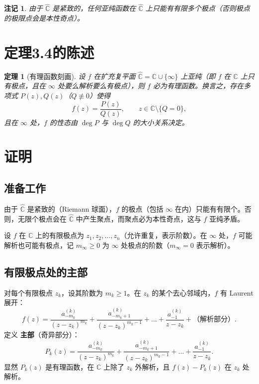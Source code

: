 \documentclass[UTF8]{ctexart}
\newtheorem{theorem}{定理}[section]
\newtheorem{remark}{注记}[section]
\numberwithin{equation}{section}
\newcommand{\CC}{\mathbb{C}}
\begin{document}
\begin{remark}
由于 $\widehat{\CC}$ 是紧致的，任何亚纯函数在 $\widehat{\CC}$ 上只能有有限多个极点（否则极点的极限点会是本性奇点）。
\end{remark}


\section{定理3.4的陈述}

\begin{theorem}[有理函数刻画]
设 $f$ 在扩充复平面 $\widehat{\CC} = \CC \cup \{\infty\}$ 上亚纯（即 $f$ 在 $\CC$ 上只有极点，且在 $\infty$ 处要么解析要么有极点），则 $f$ 必为有理函数。换言之，存在多项式 $P(z), Q(z)$（$Q\not\equiv 0$）使得
\[
f(z) = \frac{P(z)}{Q(z)},\qquad z\in\CC\setminus\{Q=0\},
\]
且在 $\infty$ 处，$f$ 的性态由 $\deg P$ 与 $\deg Q$ 的大小关系决定。
\end{theorem}

\section{证明}

\subsection{准备工作}

由于 $\widehat{\CC}$ 是紧致的（Riemann 球面），$f$ 的极点（包括 $\infty$ 在内）只能有有限个。否则，无限个极点会在 $\widehat{\CC}$ 中产生聚点，而聚点必为本性奇点，这与 $f$ 亚纯矛盾。

设 $f$ 在 $\CC$ 上的有限极点为 $z_1, z_2, \dots, z_n$（允许重复，表示阶数）。在 $\infty$ 处，$f$ 可能解析也可能有极点，记 $m_\infty \ge 0$ 为 $\infty$ 处极点的阶数（$m_\infty = 0$ 表示解析）。

\subsection{有限极点处的主部}

对每个有限极点 $z_k$，设其阶数为 $m_k \ge 1$。在 $z_k$ 的某个去心邻域内，$f$ 有 Laurent 展开：
\[
f(z) = \frac{a_{-m_k}^{(k)}}{(z-z_k)^{m_k}} + \frac{a_{-m_k+1}^{(k)}}{(z-z_k)^{m_k-1}} + \dots + \frac{a_{-1}^{(k)}}{z-z_k} + \text{（解析部分）}.
\]
定义 \textbf{主部}（奇异部分）：
\[
P_k(z) = \frac{a_{-m_k}^{(k)}}{(z-z_k)^{m_k}} + \frac{a_{-m_k+1}^{(k)}}{(z-z_k)^{m_k-1}} + \dots + \frac{a_{-1}^{(k)}}{z-z_k}.
\]
显然 $P_k(z)$ 是有理函数，在 $\CC$ 上除了 $z_k$ 外解析，且 $f(z) - P_k(z)$ 在 $z_k$ 处解析。
\end{document}
